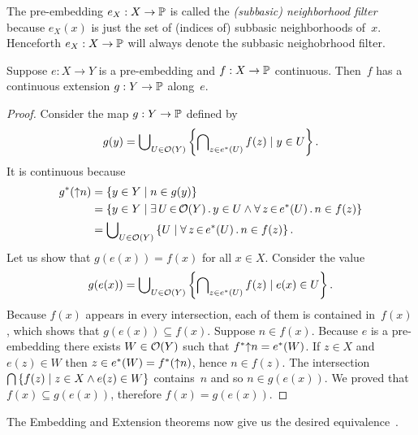 \noindent
%
The pre-embedding $e_X : X \to \mathbb{P}$ is called the \emph{(subbasic)
  neighborhood filter} because $e_X(x)$ is just the set of (indices
of) subbasic neighborhoods of~$x$. Henceforth $e_X : X \to \mathbb{P}$
will always denote the subbasic neighobrhood filter.

\begin{theorem}
  \label{thm:scott-extension}%
  Suppose $e : X \to Y$ is a pre-embedding and $f : X \to \mathbb{P}$
  continuous. Then~$f$ has a continuous extension $g : Y \to \mathbb{P}$
  along~$e$.
\end{theorem}

\begin{proof}
  Consider the map $g : Y \to \mathbb{P}$ defined by
  \begin{equation*}
    g(y) = \bigcup\nolimits_{U \in \mathcal{O}(Y)} \left\{
      \bigcap\nolimits_{z \in e^{*}(U)} f(z)
      \mid
      y \in U
    \right\}.
  \end{equation*}
  It is continuous because
  \begin{align*}
    \invim{g}(\upper{n}) &=
    \set{y \in Y \such n \in g(y)} \\
    &=
    \set{y \in Y \such \xsome{U}{
        \topol{Y}}{y \in U \land
        \xall{z}{\invim{e}(U)}{n \in f(z)}
      }
    } \\
    &=
    \tbigcup_{U \in \topol{Y}} \left\{
        U \such
        \xall{z}{\invim{e}(U)}{n \in f(z)}
      \right\}.
  \end{align*}
  Let us show that $g(e(x)) = f(x)$ for all $x \in X$. Consider the
  value
  \begin{align*}
    g(e(x)) =
    \bigcup\nolimits_{U \in \mathcal{O}(Y)} \left\{
      \bigcap\nolimits_{z \in e^{*}(U)} f(z)
      \mid
      e(x) \in U \right\}.
  \end{align*}
  Because $f(x)$ appears in every intersection, each of them is
  contained in~$f(x)$, which shows that $g(e(x)) \subseteq f(x)$.
  Suppose $n \in f(x)$. Because $e$ is a pre-embedding there exists $W
  \in \mathcal{O}(Y)$ such that $f^{*}{{\uparrow}n} = e^{*}(W)$. If
  $z \in X$ and $e(z) \in W$ then $z \in e^{*}(W) =
  f^{*}({\uparrow}n)$, hence $n \in f(z)$. The intersection
  $\bigcap\nolimits \left\{f(z) \mid z \in X \land e(z) \in W \right\}$
  contains~$n$ and so $n \in g(e(x))$. We proved that $f(x) \subseteq
  g(e(x))$, therefore $f(x) = g(e(x))$.
\end{proof}

\noindent
%
The Embedding and Extension theorems now give us the desired
equivalence~\cite{Simpson-Menni}.

